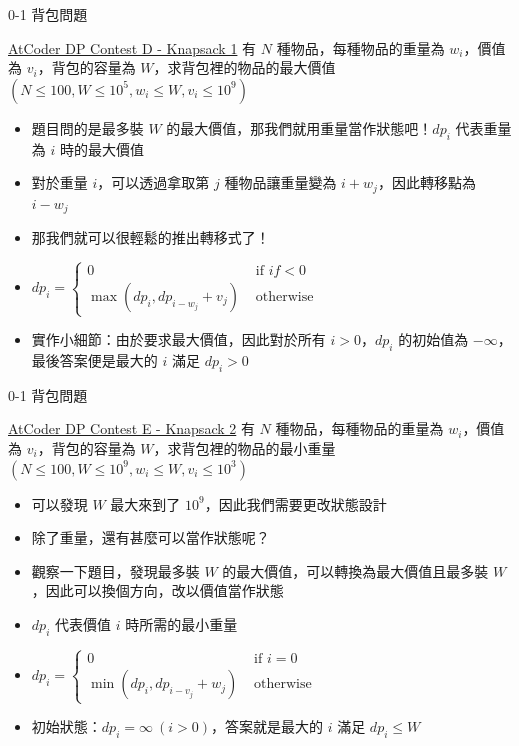 \documentclass[aspectratio=169]{beamer}
\begin{document}
    \begin{frame}{0-1 背包問題}
        \begin{block}{\href{https://atcoder.jp/contests/dp/tasks/dp_d}{AtCoder DP Contest D - Knapsack 1}}
            有 $N$ 種物品，每種物品的重量為 $w_i$，價值為 $v_i$，背包的容量為 $W$，求背包裡的物品的最大價值\\
            $(N \le 100, W \le 10^5, w_i \le W, v_i \le 10^9)$
        \end{block}

        \begin{itemize}
            \item<1-> 題目問的是最多裝 $W$ 的最大價值，那我們就用重量當作狀態吧！$dp_i$ 代表重量為 $i$ 時的最大價值
            \item<2-> 對於重量 $i$，可以透過拿取第 $j$ 種物品讓重量變為 $i + w_j$，因此轉移點為 $i - w_j$
            \item<3-> 那我們就可以很輕鬆的推出轉移式了！
            \item<4-> $dp_i = \begin{cases}
                0 & \text { if } if < 0 \\
                \max(dp_i, dp_{i - w_j} + v_j) & \text { otherwise }
            \end{cases}$
            \item<5-> 實作小細節：由於要求最大價值，因此對於所有 $i > 0$，$dp_i$ 的初始值為 $-\infty$，最後答案便是最大的 $i$ 滿足 $dp_i > 0$
        \end{itemize}
    \end{frame}

    \begin{frame}{0-1 背包問題}
        \begin{block}{\href{https://atcoder.jp/contests/dp/tasks/dp_e}{AtCoder DP Contest E - Knapsack 2}}
            有 $N$ 種物品，每種物品的重量為 $w_i$，價值為 $v_i$，背包的容量為 $W$，求背包裡的物品的最小重量\\
            $(N \le 100, W \le 10^9, w_i \le W, v_i \le 10^3)$  
        \end{block}

        \begin{itemize}
            \item<1-> 可以發現 $W$ 最大來到了 $10^9$，因此我們需要更改狀態設計
            \item<2-> 除了重量，還有甚麼可以當作狀態呢？
            \item<3-> 觀察一下題目，發現最多裝 $W$ 的最大價值，可以轉換為最大價值且最多裝 $W$，因此可以換個方向，改以價值當作狀態
            \item<4-> $dp_i$ 代表價值 $i$ 時所需的最小重量
            \item<5-> $dp_i = \begin{cases}
                0 & \text { if } i = 0 \\
                \min(dp_i, dp_{i - v_j} + w_j) & \text { otherwise }
            \end{cases}$
            \item<6-> 初始狀態：$dp_i = \infty\ (i > 0)$，答案就是最大的 $i$ 滿足 $dp_i \le W$
        \end{itemize}
    \end{frame}
\end{document}
